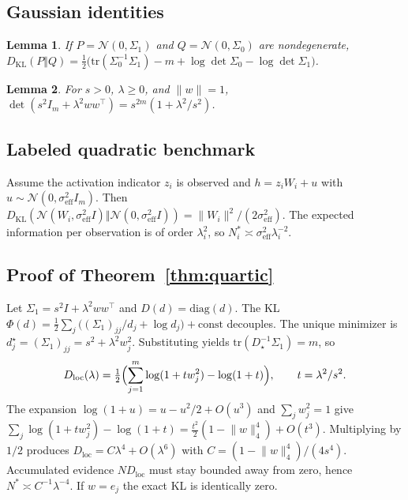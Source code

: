 \documentclass{article}
\theoremstyle{plain}
\newtheorem{lemma}{Lemma}
\newcommand{\sigeff}{\sigma_{\mathrm{eff}}}
\begin{document}
{\subsection{Gaussian identities}
\label{app:gauss}
\begin{lemma}
\label{lem:kl}
If $P=\mathcal{N}(0,\Sigma_1)$ and $Q=\mathcal{N}(0,\Sigma_0)$ are nondegenerate,
$D_{\mathrm{KL}}(P\Vert Q)=\tfrac12\bigl(\mathrm{tr}(\Sigma_0^{-1}\Sigma_1)-m+\log\det\Sigma_0-\log\det\Sigma_1\bigr)$.
\end{lemma}
\begin{lemma}
\label{lem:det}
For $s>0$, $\lambda\ge 0$, and $\lVert w\rVert=1$, $\det(s^2 I_m+\lambda^2 ww^{\top})=s^{2m}(1+\lambda^2/s^2)$.
\end{lemma}

\subsection{Labeled quadratic benchmark}
Assume the activation indicator $z_i$ is observed and $h=z_i W_i+u$ with $u\sim\mathcal{N}(0,\sigeff^2 I_m)$. Then $D_{\mathrm{KL}}(\mathcal{N}(W_i,\sigeff^2 I)\Vert\mathcal{N}(0,\sigeff^2 I))=\lVert W_i\rVert^2/(2\sigeff^2)$. The expected information per observation is of order $\lambda_i^2$, so $N_i^*\asymp\sigeff^2\lambda_i^{-2}$.

\subsection{Proof of Theorem~\ref{thm:quartic}}
\label{app:thm2}
Let $\Sigma_1=s^2 I+\lambda^2 ww^{\top}$ and $D(d)=\mathrm{diag}(d)$. The KL $\Phi(d)=\tfrac12\sum_j\bigl((\Sigma_1)_{jj}/d_j+\log d_j\bigr)+\mathrm{const}$ decouples. The unique minimizer is $d_j^\star=(\Sigma_1)_{jj}=s^2+\lambda^2 w_j^2$. Substituting yields $\mathrm{tr}(D_\star^{-1}\Sigma_1)=m$, so
\begin{equation}
D_{\mathrm{loc}}(\lambda)=\tfrac12\Bigl(\sum_{j=1}^m\log(1+t w_j^2)-\log(1+t)\Bigr),\qquad t=\lambda^2/s^2.
\end{equation}
The expansion $\log(1+u)=u-u^2/2+O(u^3)$ and $\sum_j w_j^2=1$ give
$\sum_j\log(1+t w_j^2)-\log(1+t)=\tfrac{t^2}{2}(1-\lVert w\rVert_4^4)+O(t^3)$.
Multiplying by $1/2$ produces $D_{\mathrm{loc}}=C\lambda^4+O(\lambda^6)$ with $C=(1-\lVert w\rVert_4^4)/(4s^4)$. Accumulated evidence $N D_{\mathrm{loc}}$ must stay bounded away from zero, hence $N^*\asymp C^{-1}\lambda^{-4}$. If $w=e_j$ the exact KL is identically zero.

}
\end{document}
